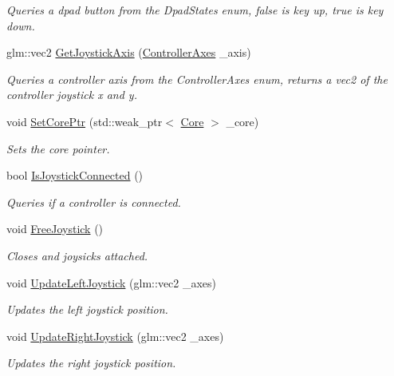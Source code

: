 \begin{DoxyCompactItemize}
\begin{DoxyCompactList}\small\item\em Queries a dpad button from the Dpad\+States enum, false is key up, true is key down. \end{DoxyCompactList}\item 
glm\+::vec2 \hyperlink{classfrontier_1_1_input_a60c4086a12484369d9e96c065b5cce52}{Get\+Joystick\+Axis} (\hyperlink{classfrontier_1_1_input_aa34e103eba0f13faf437863692310859}{Controller\+Axes} \+\_\+axis)
\begin{DoxyCompactList}\small\item\em Queries a controller axis from the Controller\+Axes enum, returns a vec2 of the controller joystick x and y. \end{DoxyCompactList}\item 
void \hyperlink{classfrontier_1_1_input_a5ce39c7eaf92aef7ea316483d797caf6}{Set\+Core\+Ptr} (std\+::weak\+\_\+ptr$<$ \hyperlink{classfrontier_1_1_core}{Core} $>$ \+\_\+core)
\begin{DoxyCompactList}\small\item\em Sets the core pointer. \end{DoxyCompactList}\item 
bool \hyperlink{classfrontier_1_1_input_a5168ef99f137fc17cb277f78eed247f8}{Is\+Joystick\+Connected} ()
\begin{DoxyCompactList}\small\item\em Queries if a controller is connected. \end{DoxyCompactList}\item 
void \hyperlink{classfrontier_1_1_input_a93acada680176426a09bd5cc4606fe6c}{Free\+Joystick} ()
\begin{DoxyCompactList}\small\item\em Closes and joysicks attached. \end{DoxyCompactList}\item 
void \hyperlink{classfrontier_1_1_input_af436dc35f51cc350434bb4b5bebbb863}{Update\+Left\+Joystick} (glm\+::vec2 \+\_\+axes)
\begin{DoxyCompactList}\small\item\em Updates the left joystick position. \end{DoxyCompactList}\item 
void \hyperlink{classfrontier_1_1_input_afd452bb826ade00ba984e249253c946d}{Update\+Right\+Joystick} (glm\+::vec2 \+\_\+axes)
\begin{DoxyCompactList}\small\item\em Updates the right joystick position. \end{DoxyCompactList}\item 

\end{DoxyCompactItemize}
